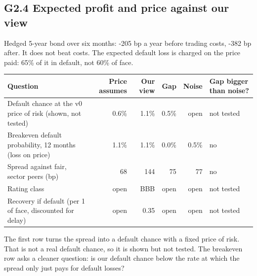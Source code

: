 \documentclass[11pt,a4paper]{article}
\begin{document}
\subsection*{G2.4 Expected profit and price against our view}
Hedged 5-year bond over six months: -205 bp a year before trading costs, -382 bp after. It does not beat costs. The expected default loss is charged on the price paid: 65\% of it in default, not 60\% of face.
\begin{center}\footnotesize\setlength{\tabcolsep}{3.5pt}\begin{tabular}{@{}p{5.2cm}rrrrl@{}}\toprule
Question & Price assumes & Our view & Gap & Noise & Gap bigger than noise? \\\midrule
Default chance at the v0 price of risk (shown, not tested) & 0.6\% & 1.1\% & 0.5\% & open & not tested \\
Breakeven default probability, 12 months (loss on price) & 1.1\% & 1.1\% & 0.0\% & 0.5\% & no \\
Spread against fair, sector peers (bp) & 68 & 144 & 75 & 77 & no \\
Rating class & open & BBB & open & open & not tested \\
Recovery if default (per 1 of face, discounted for delay) & open & 0.35 & open & open & not tested \\
\bottomrule\end{tabular}\end{center}
The first row turns the spread into a default chance with a fixed price of risk. That is not a real default chance, so it is shown but not tested. The breakeven row asks a cleaner question: is our default chance below the rate at which the spread only just pays for default losses?
\end{document}
